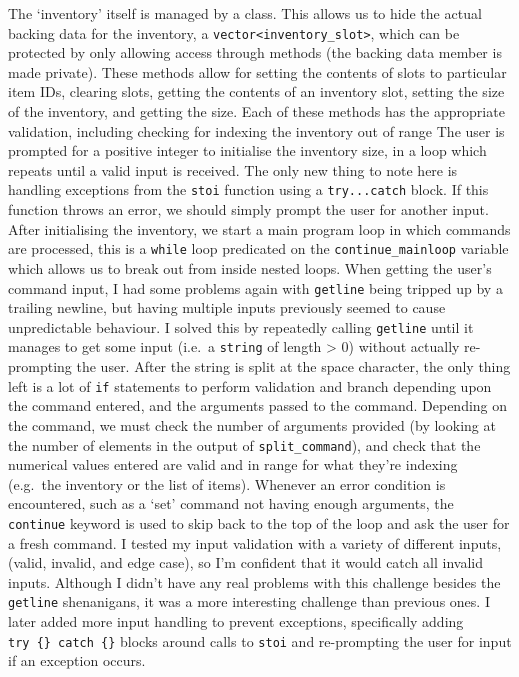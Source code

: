 \documentclass[
]{article}
\begin{document}
The `inventory' itself is managed by a class. This allows us to hide the
actual backing data for the inventory, a
\texttt{vector\textless{}inventory\_slot\textgreater{}}, which can be
protected by only allowing access through methods (the backing data
member is made private). These methods allow for setting the contents of
slots to particular item IDs, clearing slots, getting the contents of an
inventory slot, setting the size of the inventory, and getting the size.
Each of these methods has the appropriate validation, including checking
for indexing the inventory out of range The user is prompted for a
positive integer to initialise the inventory size, in a loop which
repeats until a valid input is received. The only new thing to note here
is handling exceptions from the \texttt{stoi} function using a
\texttt{try...catch} block. If this function throws an error, we should
simply prompt the user for another input. After initialising the
inventory, we start a main program loop in which commands are processed,
this is a \texttt{while} loop predicated on the
\texttt{continue\_mainloop} variable which allows us to break out from
inside nested loops. When getting the user's command input, I had some
problems again with \texttt{getline} being tripped up by a trailing
newline, but having multiple inputs previously seemed to cause
unpredictable behaviour. I solved this by repeatedly calling
\texttt{getline} until it manages to get some input (i.e.~a
\texttt{string} of length \textgreater{} 0) without actually
re-prompting the user. After the string is split at the space character,
the only thing left is a lot of \texttt{if} statements to perform
validation and branch depending upon the command entered, and the
arguments passed to the command. Depending on the command, we must check
the number of arguments provided (by looking at the number of elements
in the output of \texttt{split\_command}), and check that the numerical
values entered are valid and in range for what they're indexing
(e.g.~the inventory or the list of items). Whenever an error condition
is encountered, such as a `set' command not having enough arguments, the
\texttt{continue} keyword is used to skip back to the top of the loop
and ask the user for a fresh command. I tested my input validation with
a variety of different inputs, (valid, invalid, and edge case), so I'm
confident that it would catch all invalid inputs. Although I didn't have
any real problems with this challenge besides the \texttt{getline}
shenanigans, it was a more interesting challenge than previous ones. I
later added more input handling to prevent exceptions, specifically
adding \texttt{try\ \{\}\ catch\ \{\}} blocks around calls to
\texttt{stoi} and re-prompting the user for input if an exception
occurs.
\end{document}
